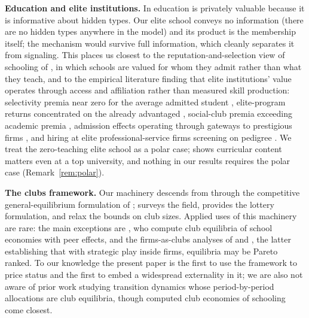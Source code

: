 \documentclass[12pt,letterpaper]{article}
\theoremstyle{definition}
\begin{document}
\textbf{Education and elite institutions.}
In \citet{spence1973signaling} education is privately valuable because it is informative about hidden types.
Our elite school conveys no information (there are no hidden types anywhere in the model) and its product is the membership itself; the mechanism would survive full information, which cleanly separates it from signaling.
This places us closest to the reputation-and-selection view of schooling of \citet{macleodurquiola2019}, in which schools are valued for whom they admit rather than what they teach, and to the empirical literature finding that elite institutions' value operates through access and affiliation rather than measured skill production: selectivity premia near zero for the average admitted student \citep{dalekrueger2002}, elite-program returns concentrated on the already advantaged \citep{zimmerman2019elite}, social-club premia exceeding academic premia \citep{michelmanpricezimmerman2022}, admission effects operating through gateways to prestigious firms \citep{chettydemingfriedman2026}, and hiring at elite professional-service firms screening on pedigree \citep{rivera2015pedigree}.
We treat the zero-teaching elite school as a polar case; \citet{arteaga2018} shows curricular content matters even at a top university, and nothing in our results requires the polar case (Remark~\ref{rem:polar}).

\textbf{The clubs framework.}
Our machinery descends from \citet{buchanan1965clubs} through the competitive general-equilibrium formulation of \citet{ellickson1999clubs,ellickson2001clubs,ellickson2006organization}; \citet{scotchmer2002clubs} surveys the field, \citet{coleprescott1997valuation} provides the lottery formulation, and \citet{allouchwooders2008} relax the bounds on club sizes.
Applied uses of this machinery are rare: the main exceptions are \citet{caucutt2001peer,caucutt2002vouchers}, who compute club equilibria of school economies with peer effects, and the firms-as-clubs analyses of \citet{prescotttownsend2006firms} and \citet{zame2007incentives}, the latter establishing that with strategic play inside firms, equilibria may be Pareto ranked.
To our knowledge the present paper is the first to use the framework to price status and the first to embed a widespread externality in it; we are also not aware of prior work studying transition dynamics whose period-by-period allocations are club equilibria, though computed club economies of schooling \citep{caucutt2001peer,caucutt2002vouchers} come closest.
\end{document}
